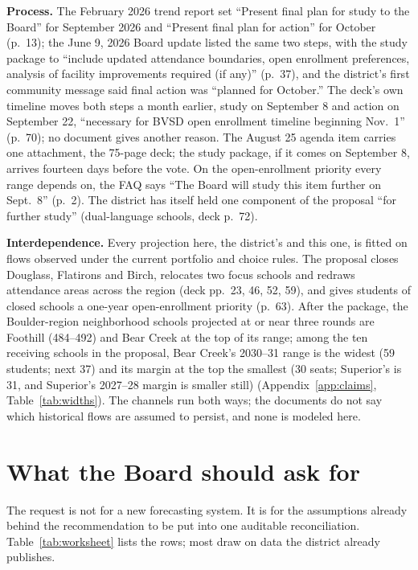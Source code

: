\documentclass[11pt]{article}
\begin{document}
\textbf{Process.} The February 2026 trend report set ``Present final plan for study to the Board'' for September 2026 and ``Present final plan for action'' for October (p.\ 13); the June 9, 2026 Board update listed the same two steps, with the study package to ``include updated attendance boundaries, open enrollment preferences, analysis of facility improvements required (if any)'' (p.\ 37), and the district's first community message said final action was ``planned for October.'' The deck's own timeline moves both steps a month earlier, study on September 8 and action on September 22, ``necessary for BVSD open enrollment timeline beginning Nov.\ 1'' (p.\ 70); no document gives another reason. The August 25 agenda item carries one attachment, the 75-page deck; the study package, if it comes on September 8, arrives fourteen days before the vote. On the open-enrollment priority every range depends on, the FAQ says ``The Board will study this item further on Sept.\ 8'' (p.\ 2). The district has itself held one component of the proposal ``for further study'' (dual-language schools, deck p.\ 72).

\textbf{Interdependence.} Every projection here, the district's and this one, is fitted on flows observed under the current portfolio and choice rules. The proposal closes Douglass, Flatirons and Birch, relocates two focus schools and redraws attendance areas across the region (deck pp.\ 23, 46, 52, 59), and gives students of closed schools a one-year open-enrollment priority (p.\ 63). After the package, the Boulder-region neighborhood schools projected at or near three rounds are Foothill (484--492) and Bear Creek at the top of its range; among the ten receiving schools in the proposal, Bear Creek's 2030--31 range is the widest (59 students; next 37) and its margin at the top the smallest (30 seats; Superior's is 31, and Superior's 2027--28 margin is smaller still) (Appendix~\ref{app:claims}, Table~\ref{tab:widths}). The channels run both ways; the documents do not say which historical flows are assumed to persist, and none is modeled here.

\section{What the Board should ask for}\label{sec:s6}
The request is not for a new forecasting system. It is for the assumptions already behind the recommendation to be put into one auditable reconciliation. Table~\ref{tab:worksheet} lists the rows; most draw on data the district already publishes.
\end{document}
